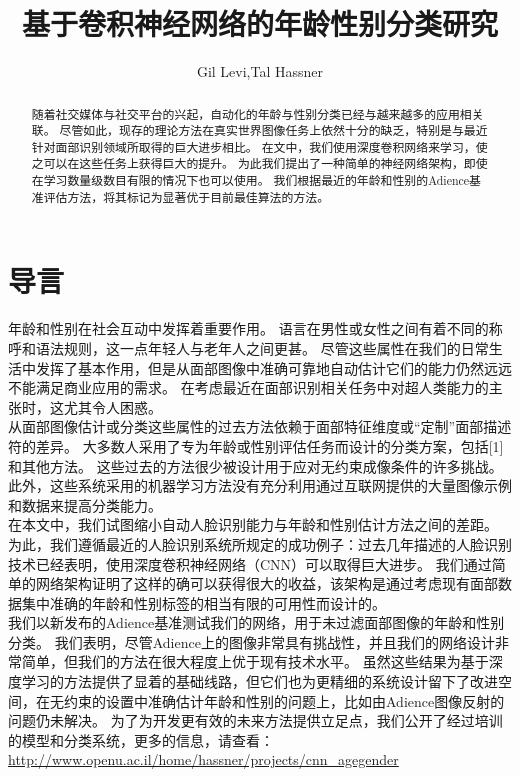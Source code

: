 \documentclass{article}
\author{Gil Levi,Tal Hassner}
\title{基于卷积神经网络的年龄性别分类研究}
\begin{document}
\maketitle
\begin{abstract}
随着社交媒体与社交平台的兴起，自动化的年龄与性别分类已经与越来越多的应用相关联。
尽管如此，现存的理论方法在真实世界图像任务上依然十分的缺乏，特别是与最近针对面部识别领域所取得的巨大进步相比。
在文中，我们使用深度卷积网络来学习，使之可以在这些任务上获得巨大的提升。
为此我们提出了一种简单的神经网络架构，即使在学习数量级数目有限的情况下也可以使用。
我们根据最近的年龄和性别的Adience基准评估方法，将其标记为显著优于目前最佳算法的方法。
\end{abstract}

\section{导言}
年龄和性别在社会互动中发挥着重要作用。
语言在男性或女性之间有着不同的称呼和语法规则，这一点年轻人与老年人之间更甚。
尽管这些属性在我们的日常生活中发挥了基本作用，但是从面部图像中准确可靠地自动估计它们的能力仍然远远不能满足商业应用的需求。
在考虑最近在面部识别相关任务中对超人类能力的主张时，这尤其令人困惑。\\

从面部图像估计或分类这些属性的过去方法依赖于面部特征维度或“定制”面部描述符的差异。
大多数人采用了专为年龄或性别评估任务而设计的分类方案，包括[1]和其他方法。
这些过去的方法很少被设计用于应对无约束成像条件的许多挑战。
此外，这些系统采用的机器学习方法没有充分利用通过互联网提供的大量图像示例和数据来提高分类能力。\\

在本文中，我们试图缩小自动人脸识别能力与年龄和性别估计方法之间的差距。
为此，我们遵循最近的人脸识别系统所规定的成功例子：过去几年描述的人脸识别技术已经表明，使用深度卷积神经网络（CNN）可以取得巨大进步。
我们通过简单的网络架构证明了这样的确可以获得很大的收益，该架构是通过考虑现有面部数据集中准确的年龄和性别标签的相当有限的可用性而设计的。\\

我们以新发布的Adience基准测试我们的网络，用于未过滤面部图像的年龄和性别分类。
我们表明，尽管Adience上的图像非常具有挑战性，并且我们的网络设计非常简单，但我们的方法在很大程度上优于现有技术水平。
虽然这些结果为基于深度学习的方法提供了显着的基础线路，但它们也为更精细的系统设计留下了改进空间，在无约束的设置中准确估计年龄和性别的问题上，比如由Adience图像反射的问题仍未解决。
为了为开发更有效的未来方法提供立足点，我们公开了经过培训的模型和分类系统，更多的信息，请查看：\url{http://www.openu.ac.il/home/hassner/projects/cnn_agegender}\\
\end{document}
